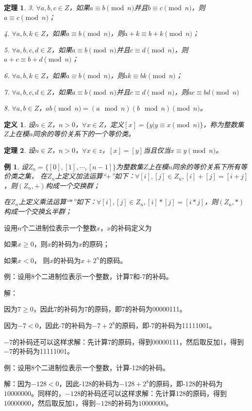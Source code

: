\documentclass{article}
\newtheorem{Def}{定义}
\newtheorem{Thm}{定理}
\newtheorem*{Example}{例}
\begin{document}
\begin{CJK*}{UTF8}{gbsn}
\begin{Thm}
  3. $\forall a,b,c\in Z$，如果$a\equiv b\pmod{n}$并且$b\equiv c\pmod{n}$，则$a\equiv c\pmod{n}$；

  4. $\forall a,b,k\in Z$，如果$a\equiv b\pmod{n}$，则$a+k\equiv b+k\pmod{n}$；

  5. $\forall a,b,c,d\in Z$，如果$a\equiv b\pmod{n}$并且$c\equiv d\pmod{n}$，则$a+c\equiv b+d \pmod{n}$；

  6. $\forall a,b,k\in Z$，如果$a\equiv b\pmod{n}$，则$ak\equiv bk\pmod{n}$；

  7. $\forall a,b,c,d\in Z$，如果$a\equiv b\pmod{n}$并且$c\equiv d\pmod{n}$，则$ac\equiv bd \pmod{n}$

  8. $\forall a,b\in Z$，$ab \pmod{n}=(a\mod n)(b\mod n) \pmod{n}$。
\end{Thm}

\begin{Def}
  设$n\in Z$，$n>0$，$\forall x\in Z$，定义$[x]=\{y|y\equiv x \pmod{n}\}$，称为整数集$Z$上在模$n$同余的等价关系下的一个等价类。
\end{Def}
\begin{Thm}
  设$n\in Z$，$n>0$，$\forall x\in z$，$[x]=[y]$当且仅当$x\equiv y\pmod{n}$。
\end{Thm}

\begin{Example}
  设$Z_n=\{[0],[1],\cdots,[n-1]\}$为整数集$Z$上在模$n$同余的等价关系下所有等价类之集，
  在$Z_n$上定义加法运算“$+$”如下：$\forall [i],[j]\in Z_n,[i]+[j]=[i+j]$，则$(Z_n,+)$构成一个交换群；

  在$Z_n$上定义乘法运算“$*$”如下：$\forall [i],[j]\in Z_n,[i]*[j]=[i*j]$，则$(Z_n,*)$构成一个交换幺半群；
\end{Example}


设用$n$个二进制位表示一个整数$x$，$x$的补码定义为

如果$x\geq 0$，则$x$的补码为$x$的原码；

如果$x < 0$， 则$x$的补码为$x+2^n$的原码。

例：设用8个二进制位表示一个整数，计算7和-7的补码。

解：

因为$7\geq 0$，因此7的补码为7的原码，即7的补码为00000111。

因为$-7 < 0$，因此-7的补码为$-7+2^8$的原码，即-7的补码为11111001。

$-7$的补码还可以这样求解：先计算7的原码，得到00000111，然后取反加1，得到$-7$的补码为11111001。

例：设用8个二进制位表示一个整数，计算-128的补码。

解：因为$-128 < 0$，因此-128的补码为$-128+2^8$的原码，即-128的补码为$10000000$。同样的，$-128$的补码还可以这样求解：先计算128的原码，得到$10000000$，然后取反加1，得到$-128$的补码为$10000000$。


\end{CJK*}
\end{document}
